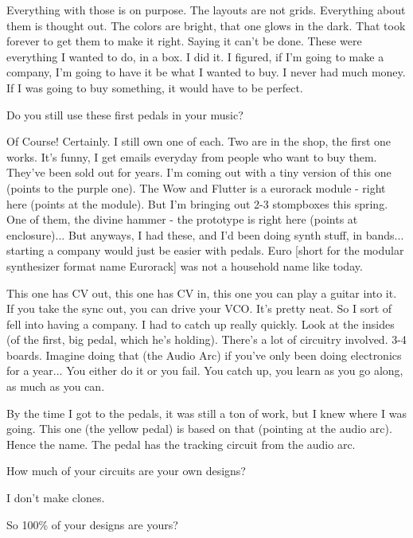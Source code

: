 Everything with those is on purpose. The layouts are not grids. Everything about them is thought out. The colors are bright, that one glows in the dark. That took forever to get them to make it right. Saying it can't be done. These were everything I wanted to do, in a box. I did it. I figured, if I'm going to make a company, I'm going to have it be what I wanted to buy. I never had much money. If I was going to buy something, it would have to be perfect. 

Do you still use these first pedals in your music? 

Of Course! Certainly. I still own one of each. Two are in the shop, the first one works. It's funny, I get emails everyday from people who want to buy them. They've been sold out for years. I'm coming out with a tiny version of this one (points to the purple one). The Wow and Flutter is a eurorack module - right here (points at the module). But I'm bringing out 2-3 stompboxes this spring. One of them, the divine hammer - the prototype is right here (points at enclosure)... But anyways, I had these, and I'd been doing synth stuff, in bands... starting a company would just be easier with pedals. Euro [short for the modular synthesizer format name Eurorack] was not a household name like today. 

This one has CV out, this one has CV in, this one you can play a guitar into it. If you take the sync out, you can drive your VCO. It's pretty neat. So I sort of fell into having a company. I had to catch up really quickly. Look at the insides (of the first, big pedal, which he's holding). There's a lot of circuitry involved. 3-4 boards. Imagine doing that (the Audio Arc) if you've only been doing electronics for a year... You either do it or you fail. You catch up, you learn as you go along, as much as you can. 

By the time I got to the pedals, it was still a ton of work, but I knew where I was going. This one (the yellow pedal) is based on that (pointing at the audio arc). Hence the name. The pedal has the tracking circuit from the audio arc. 

How much of your circuits are your own designs? 

I don't make clones. 

So 100\% of your designs are yours? 

